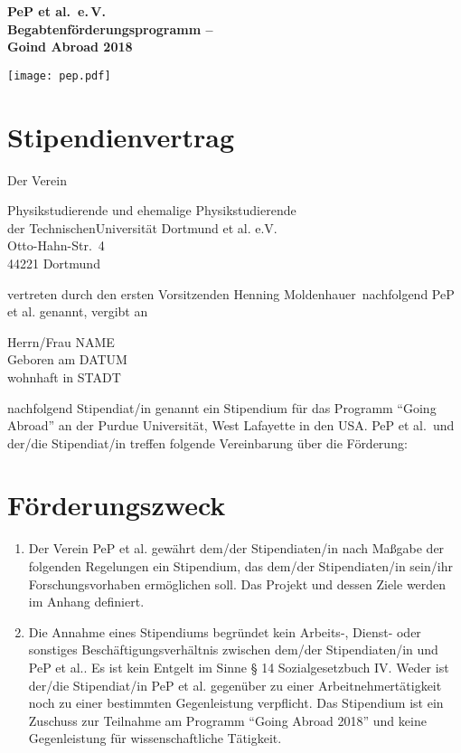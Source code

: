\documentclass[
  paper=a4,
  fontsize=12pt,
  DIV=16,
  parskip=full,
  headinclude=true,
]{scrartcl}
\date{02. Februar 2015}
\newcommand\vorsitzender{Henning Moldenhauer}
\newcommand\stipyear{2018}    %
\newcommand\stipendiat{NAME}    %
\newcommand\stipgeburt{DATUM}   %
\newcommand\stipanschrift{STADT}  %
\begin{document}
  \begin{minipage}{0.45\textwidth}%
    \large\bfseries PeP et al.\ e.\,V.\\%
    Begabtenförderungsprogramm –\\%
    Goind Abroad \stipyear%
  \end{minipage}%
  \hfill%
  \begin{minipage}{0.45\textwidth}%
  \hfill\texttt{[image: pep.pdf]}
  \end{minipage}%
\section*{Stipendienvertrag}

Der Verein

Physikstudierende und ehemalige Physikstudierende\\
der TechnischenUniversität Dortmund et al. e.V.\\
Otto-Hahn-Str.~4\\
44221 Dortmund

vertreten durch den ersten Vorsitzenden \vorsitzender\ nachfolgend
PeP et al. genannt, vergibt an

Herrn/Frau \stipendiat \\
Geboren am \stipgeburt \\
wohnhaft in \stipanschrift

nachfolgend Stipendiat/in genannt ein Stipendium für das Programm
\enquote{Going Abroad} an der Purdue Universität, West Lafayette in den USA.
PeP et al.\ und der/die Stipendiat/in treffen folgende Vereinbarung über die
Förderung:

\section{Förderungszweck}

\begin{enumerate}[\qquad(1)]
  \item Der Verein PeP et al. gewährt dem/der Stipendiaten/in nach
    Maßgabe der folgenden Regelungen ein Stipendium, das
    dem/der Stipendiaten/in sein/ihr Forschungsvorhaben ermöglichen soll.
    Das Projekt und dessen Ziele werden im Anhang definiert.
  \item Die Annahme eines Stipendiums begründet kein Arbeits-, Dienst-
    oder sonstiges Beschäftigungsverhältnis zwischen dem/der
    Stipendiaten/in und PeP et al.. Es ist kein Entgelt im Sinne
    § 14 Sozialgesetzbuch IV. Weder ist der/die Stipendiat/in
    PeP et al. gegenüber zu einer Arbeitnehmertätigkeit
    noch zu einer bestimmten Gegenleistung verpflicht.
    Das Stipendium ist ein Zuschuss zur Teilnahme am Programm
    \enquote{Going Abroad \stipyear} und keine Gegenleistung für
    wissenschaftliche Tätigkeit.
\end{enumerate}
\end{document}
